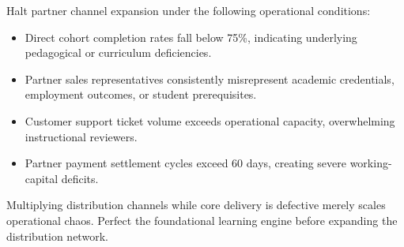 Halt partner channel expansion under the following operational conditions:
\begin{itemize}
\item Direct cohort completion rates fall below 75\%, indicating underlying pedagogical or curriculum deficiencies.
\item Partner sales representatives consistently misrepresent academic credentials, employment outcomes, or student prerequisites.
\item Customer support ticket volume exceeds operational capacity, overwhelming instructional reviewers.
\item Partner payment settlement cycles exceed 60 days, creating severe working-capital deficits.
\end{itemize}
Multiplying distribution channels while core delivery is defective merely scales operational chaos. Perfect the foundational learning engine before expanding the distribution network.
